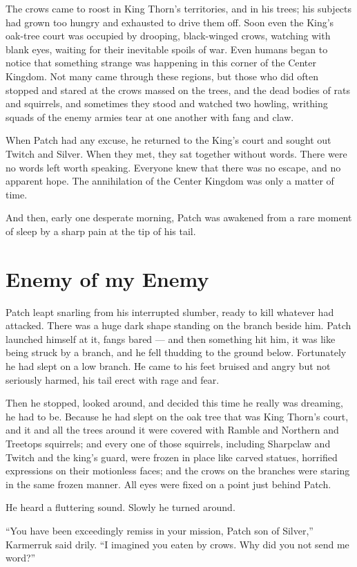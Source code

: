 \documentclass[ebook,oneside,openany,17pt]{memoir}
\renewcommand{\thechapter}{\Roman{chapter}}
\newcounter{sections}
\newcommand{\sections}[1]{%
  \section*{#1}
  \addtocounter{sections}{1}%
  \pdfbookmark[1]{#1}{section.\thechapter.\thesections}}
\begin{document}
The crows came to roost in King Thorn’s territories, and in his trees;
his subjects had grown too hungry and exhausted to drive them
off. Soon even the King’s oak-tree court was occupied by drooping,
black-winged crows, watching with blank eyes, waiting for their
inevitable spoils of war. Even humans began to notice that something
strange was happening in this corner of the Center Kingdom. Not many
came through these regions, but those who did often stopped and stared
at the crows massed on the trees, and the dead bodies of rats and
squirrels, and sometimes they stood and watched two howling, writhing
squads of the enemy armies tear at one another with fang and claw.

When Patch had any excuse, he returned to the King’s court and sought
out Twitch and Silver. When they met, they sat together without
words. There were no words left worth speaking. Everyone knew that
there was no escape, and no apparent hope. The annihilation of the
Center Kingdom was only a matter of time.

And then, early one desperate morning, Patch was awakened from a rare
moment of sleep by a sharp pain at the tip of his tail.


\sections{Enemy of my Enemy}

Patch leapt snarling from his interrupted slumber, ready to kill
whatever had attacked. There was a huge dark shape standing on the
branch beside him. Patch launched himself at it, fangs bared — and
then something hit him, it was like being struck by a branch, and he
fell thudding to the ground below. Fortunately he had slept on a low
branch. He came to his feet bruised and angry but not seriously
harmed, his tail erect with rage and fear.

Then he stopped, looked around, and decided this time he really was
dreaming, he had to be. Because he had slept on the oak tree that was
King Thorn’s court, and it and all the trees around it were covered
with Ramble and Northern and Treetops squirrels; and every one of
those squirrels, including Sharpclaw and Twitch and the king’s guard,
were frozen in place like carved statues, horrified expressions on
their motionless faces; and the crows on the branches were staring in
the same frozen manner. All eyes were fixed on a point just behind
Patch.

He heard a fluttering sound. Slowly he turned around.

“You have been exceedingly remiss in your mission, Patch son of
Silver,” Karmerruk said drily. “I imagined you eaten by crows. Why did
you not send me word?”
\end{document}
